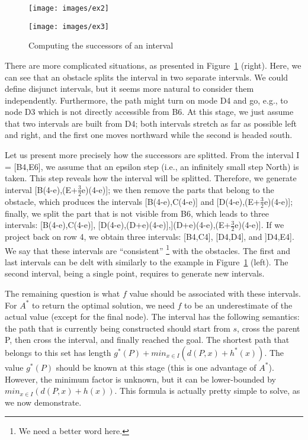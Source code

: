 \begin{figure}[ht]
  \begin{minipage}{0.5\linewidth}
  \begin{center}
    \texttt{[image: images/ex2]}
  \end{center}
  \end{minipage}
  \begin{minipage}{0.5\linewidth}
  \begin{center}
    \texttt{[image: images/ex3]}
  \end{center}
  \end{minipage}
  \caption{Computing the successors of an interval}
  \label{fig::succ1}
\end{figure}

There are more complicated situations, 
as presented in Figure~\ref{fig::succ1} (right).  
Here, we can see that an obstacle splits the interval 
in two separate intervals.  
We could define disjunct intervals, 
but it seems more natural to consider them independently.  
Furthermore, the path might turn on mode D4 
and go, e.g., to node D3 which is not directly accessible from B6.  
At this stage, we just assume that two intervals 
are built from D4; 
both intervals stretch as far as possible left and right, 
and the first one moves northward 
while the second is headed south.  

Let us present more precisely how the successors are splitted.  
From the interval I = [B4,E6], 
we assume that an epsilon step 
(i.e., an infinitely small step North) is taken.  
This step reveals how the interval will be splitted.  
Therefore, we generate interval [B(4-e),(E+$\frac{3}{2}$e)(4-e)]; 
we then remove the parts that belong to the obstacle, 
which produces the intervals [B(4-e),C(4-e)] 
and [D(4-e),(E+$\frac{3}{2}$e)(4-e)]; 
finally, we split the part that is not visible from B6, 
which leads to three intervals: [B(4-e),C(4-e)], 
[D(4-e),(D+e)(4-e)],](D+e)(4-e),(E+$\frac{3}{2}$e)(4-e)].  
If we project back on row 4, 
we obtain three intervals: 
[B4,C4], [D4,D4], and ]D4,E4].  
We say that these intervals are ``consistent''%
\footnote{We need a better word here.} 
with the obstacles.  
The first and last intervals can be delt with similarly 
to the example in Figure~\ref{fig::succ1} (left).  
The second interval, being a single point, 
requires to generate new intervals.  

The remaining question is what $f$ value 
should be associated with these intervals.  
For $A^*$ to return the optimal solution, 
we need $f$ to be an underestimate of the actual value 
(except for the final node).  
The interval has the following semantics: 
the path that is currently being constructed 
should start from $s$, cross the parent P, 
then cross the interval, and finally reached the goal.  
The shortest path that belongs to this set 
has length $g^*(P) + min_{x \in I}(d(P,x) + h^*(x))$.  
The value $g^*(P)$ should be known at this stage 
(this is one advantage of $A^*$).  
However, the minimum factor is unknown, 
but it can be lower-bounded by $min_{x \in I}(d(P,x) + h(x))$.  
This formula is actually pretty simple to solve, as we now demonstrate.  

